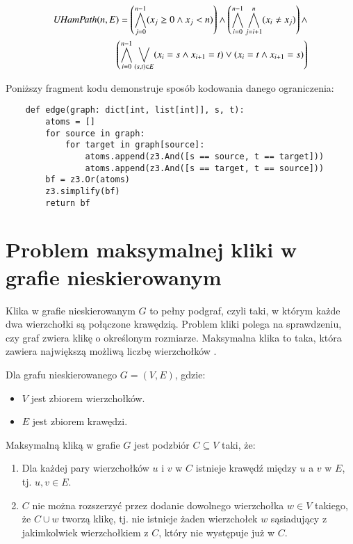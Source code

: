 \begin{align*}
	{\mathit{UHamPath}}(n, E) = \left( \bigwedge_{j=0}^{n-1} (x_j \geq 0 \land x_j < n) \right) \land 
	\left( \bigwedge_{i=0}^{n-1} \bigwedge_{j=i+1}^{n} (x_i \neq x_j) \right) \land \\
	\left( \bigwedge_{i=0}^{n-1} \bigvee_{(s,t) \in E} (x_i = s \land x_{i+1} = t) \lor (x_i = t \land x_{i+1} = s) \right)
\end{align*}

Poniższy fragment kodu demonstruje sposób kodowania danego ograniczenia:

\begin{lstlisting}
	def edge(graph: dict[int, list[int]], s, t):
		atoms = []
		for source in graph:
			for target in graph[source]:
				atoms.append(z3.And([s == source, t == target])) 
				atoms.append(z3.And([s == target, t == source]))
		bf = z3.Or(atoms)
		z3.simplify(bf)
		return bf
\end{lstlisting}

\section{Problem maksymalnej kliki w grafie nieskierowanym}

Klika w grafie nieskierowanym \(G\) to pełny podgraf, czyli taki, w którym każde dwa wierzchołki są połączone krawędzią. Problem kliki polega na sprawdzeniu, czy graf zwiera klikę o określonym rozmiarze. Maksymalna klika to taka, która zawiera największą możliwą liczbę wierzchołków \cite{Sipser0086373}. 

Dla grafu nieskierowanego $G = (V, E)$, gdzie:
\begin{itemize}
 	\item \(V\) jest zbiorem wierzchołków.
 	\item \(E\) jest zbiorem krawędzi.
\end{itemize}
Maksymalną kliką w grafie \(G\) jest podzbiór $C \subseteq V$ taki, że:
\begin{enumerate}
 	\item Dla każdej pary wierzchołków \(u\) i \(v\) w \(C\) istnieje krawędź między \(u\) a \(v\) w \(E\), tj. ${u, v}\in E$. 
 	\item \(C\) nie można rozszerzyć przez dodanie dowolnego wierzchołka $w\in V$ takiego, że $C \cup {w}$ tworzą klikę, tj. nie istnieje żaden wierzchołek \(w\) sąsiadujący z jakimkolwiek wierzchołkiem z \(C\), który nie występuje już w \(C\).
\end{enumerate}


